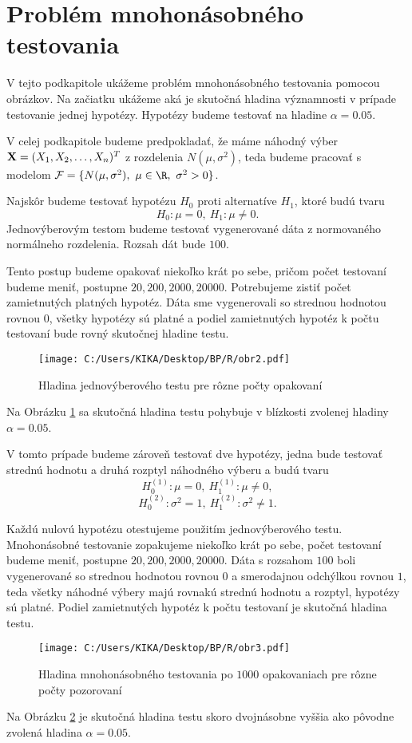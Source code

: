 \section{Problém mnohonásobného testovania}

V tejto podkapitole ukážeme problém mnohonásobného testovania pomocou obrázkov. 
Na začiatku ukážeme aká je skutočná hladina významnosti v prípade testovanie jednej hypotézy. 
Hypotézy budeme testovať na hladine $\alpha = 0.05$. 

V celej podkapitole budeme predpokladať, že máme náhodný výber
${\bf X} = (X_1, X_2, \dots, X_n)^T$ z rozdelenia $N(\mu, \sigma^2)$, 
teda budeme pracovať s modelom $\mathcal{F} = \{ N(\mu, \sigma^2),~\mu \in \R,~\sigma^2>0 \}$. 

Najskôr budeme testovať hypotézu $H_0$ proti alternatíve $H_1$, ktoré budú tvaru 
$$ H_0: \mu = 0,~H_1: \mu \neq 0. $$
Jednovýberovým testom budeme testovať vygenerované dáta z normovaného normálneho rozdelenia. 
Rozsah dát bude $100$. 

Tento postup budeme opakovať niekoľko krát po sebe, pričom počet testovaní budeme meniť, 
postupne $20, 200, 2000, 20000$. 
Potrebujeme zistiť počet zamietnutých platných hypotéz. 
Dáta sme vygenerovali so strednou hodnotou rovnou $0$, 
všetky hypotézy sú platné a podiel zamietnutých hypotéz k počtu testovaní bude rovný skutočnej hladine testu. 

\begin{figure}[h!]
  \centering
  \texttt{[image: C:/Users/KIKA/Desktop/BP/R/obr2.pdf]}
  \caption{Hladina jednovýberového testu pre rôzne počty opakovaní}
  \label{obr02:2}
\end{figure}

Na Obrázku \ref{obr02:2} sa skutočná hladina testu pohybuje v blízkosti zvolenej hladiny $\alpha = 0.05$.             

V tomto prípade budeme zároveň testovať dve hypotézy, jedna bude testovať strednú hodnotu a druhá rozptyl náhodného výberu 
a budú tvaru
$$ H_0^{(1)}: \mu = 0,~H_1^{(1)}: \mu \neq 0, $$
$$ H_0^{(2)}: \sigma^2 = 1,~H_1^{(2)}: \sigma^2 \neq 1. $$ 

Každú nulovú hypotézu otestujeme použitím jednovýberového testu. 
Mnohonásobné testovanie zopakujeme niekoľko krát po sebe, počet testovaní budeme meniť, 
postupne $20, 200, 2000, 20000$. 
Dáta s rozsahom $100$ boli vygenerované so strednou hodnotou rovnou $0$ a smerodajnou odchýlkou rovnou $1$,  
teda všetky náhodné výbery majú rovnakú strednú hodnotu a rozptyl, hypotézy sú platné. 
Podiel zamietnutých hypotéz k počtu testovaní je skutočná hladina testu. 

\begin{figure}[h!]
  \centering
  \texttt{[image: C:/Users/KIKA/Desktop/BP/R/obr3.pdf]}
  \caption{Hladina mnohonásobného testovania po $1000$ opakovaniach pre rôzne počty pozorovaní}
  \label{obr02:3}
\end{figure}

Na Obrázku \ref{obr02:3} je skutočná hladina testu skoro dvojnásobne vyššia 
ako pôvodne zvolená hladina $\alpha = 0.05$. 
